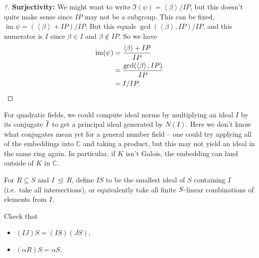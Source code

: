 \begin{proof}[?]
\textbf{Surjectivity:} We might want to write
\(\Im(\psi) = \left\langle{ \beta }\right\rangle / IP\), but this
doesn't quite make sense since \(IP\) may not be a subgroup. This can be
fixed,
\(\operatorname{im}\psi = ( \left\langle{ \beta }\right\rangle + IP) / IP\).
But this equals \(\gcd( \left\langle{ \beta }\right\rangle, IP ) / IP\),
and this numerator is \(I\) since \(\beta\in I\) and
\(\beta\not\in IP\). So we have
\begin{align*}
\operatorname{im}(\psi) 
&= {\left\langle{ \beta }\right\rangle + IP \over  IP } \\
&= { \gcd( \left\langle{ \beta }\right\rangle, IP ) \over IP } \\
&= I/IP
.\end{align*}

\end{proof}

\begin{remark}

For quadratic fields, we could compute ideal norms by multiplying an
ideal \(I\) by its conjugate
\(\mkern 1.5mu\overline{\mkern-1.5muI\mkern-1.5mu}\mkern 1.5mu\) to get
a principal ideal generated by \(N(I)\). Here we don't know what
conjugates mean yet for a general number field -- one could try applying
all of the embeddings into \({\mathbb{C}}\) and taking a product, but
this may not yield an ideal in the same ring again. In particular, if
\(K\) isn't Galois, the embedding can land outside of \(K\) in
\({\mathbb{C}}\).

\end{remark}

\begin{definition}

For \(R \subseteq S\) and \(I{~\trianglelefteq~}R\), define \(IS\) to be
the smallest ideal of \(S\) containing \(I\) (i.e.~take all
intersections), or equivalently take all finite \(S{\hbox{-}}\)linear
combinations of elements from \(I\).

\end{definition}

\begin{exercise}[?]

Check that

\begin{itemize}
\tightlist
\item
  \((IJ)S = (IS)(JS)\),
\item
  \((\alpha R)S = \alpha S\).
\end{itemize}

\end{exercise}

